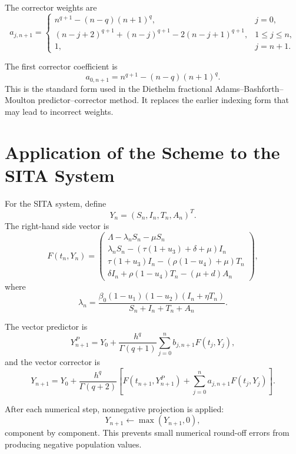 The corrector weights are
\begin{equation}
a_{j,n+1}=
\begin{cases}
n^{q+1}-(n-q)(n+1)^q, & j=0,\\[4pt]
(n-j+2)^{q+1}+(n-j)^{q+1}-2(n-j+1)^{q+1}, & 1\leq j\leq n,\\[4pt]
1, & j=n+1.
\end{cases}
\label{eq:correct_corrector_weights}
\end{equation}

\begin{resultbox}[title={Corrected ABM weight formula}]
The first corrector coefficient is
\[
a_{0,n+1}=n^{q+1}-(n-q)(n+1)^q.
\]
This is the standard form used in the Diethelm fractional Adams--Bashforth--Moulton predictor--corrector method. It replaces the earlier indexing form that may lead to incorrect weights.
\end{resultbox}

\section{Application of the Scheme to the SITA System}

For the SITA system, define
\[
Y_n=(S_n,I_n,T_n,A_n)^T.
\]
The right-hand side vector is
\[
F(t_n,Y_n)=
\begin{pmatrix}
\Lambda-\lambda_nS_n-\mu S_n\\
\lambda_nS_n-(\tau(1+u_3)+\delta+\mu)I_n\\
\tau(1+u_3)I_n-(\rho(1-u_4)+\mu)T_n\\
\delta I_n+\rho(1-u_4)T_n-(\mu+d)A_n
\end{pmatrix},
\]
where
\[
\lambda_n=
\frac{\beta_0(1-u_1)(1-u_2)(I_n+\eta T_n)}
{S_n+I_n+T_n+A_n}.
\]

The vector predictor is
\begin{equation}
Y_{n+1}^{P}
=
Y_0+\frac{h^q}{\Gamma(q+1)}
\sum_{j=0}^{n}b_{j,n+1}F(t_j,Y_j),
\label{eq:vector_predictor}
\end{equation}
and the vector corrector is
\begin{equation}
Y_{n+1}
=
Y_0+\frac{h^q}{\Gamma(q+2)}
\left[
F(t_{n+1},Y_{n+1}^{P})
+
\sum_{j=0}^{n}a_{j,n+1}F(t_j,Y_j)
\right].
\label{eq:vector_corrector}
\end{equation}

After each numerical step, nonnegative projection is applied:
\[
Y_{n+1}\leftarrow \max(Y_{n+1},0),
\]
component by component. This prevents small numerical round-off errors from producing negative population values.

